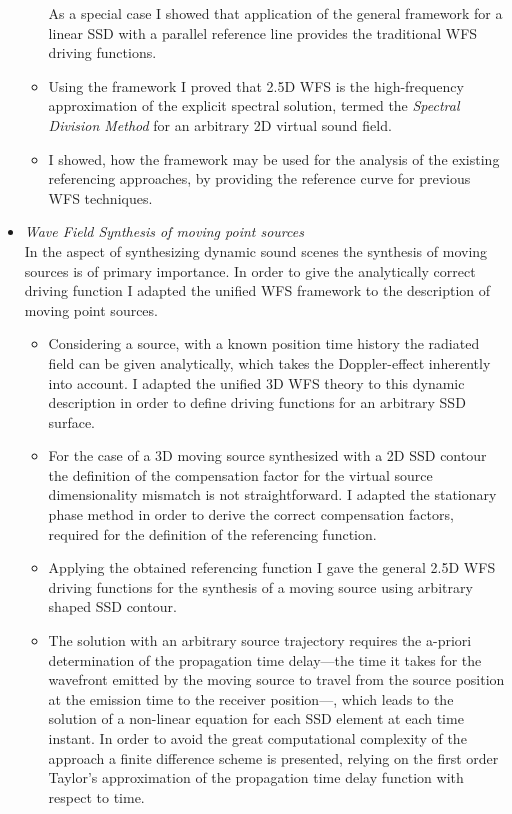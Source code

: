 \documentclass[a4paper,10pt]{article}
\begin{document}
\begin{itemize}
\begin{itemize}
As a special case I showed that application of the general framework for a linear SSD with a parallel reference line provides the traditional WFS driving functions.
\item Using the framework I proved that 2.5D WFS is the high-frequency approximation of the explicit spectral solution, termed the \emph{Spectral Division Method} for an arbitrary 2D virtual sound field.
\item I showed, how the framework may be used for the analysis of the existing referencing approaches, by providing the reference curve for previous WFS techniques.
\end{itemize}
%
\item \emph{Wave Field Synthesis of moving point sources}\\
In the aspect of synthesizing dynamic sound scenes the synthesis of moving sources is of primary importance.
In order to give the analytically correct driving function I adapted the unified WFS framework to the description of moving point sources.
\begin{itemize}
\item Considering a source, with a known position time history the radiated field can be given analytically, which takes the Doppler-effect inherently into account.
I adapted the unified 3D WFS theory to this dynamic description in order to define driving functions for an arbitrary SSD surface.
\item For the case of a 3D moving source synthesized with a 2D SSD contour the definition of the compensation factor for the virtual source dimensionality mismatch is not straightforward.
I adapted the stationary phase method in order to derive the correct compensation factors, required for the definition of the referencing function. 
\item Applying the obtained referencing function I gave the general 2.5D WFS driving functions for the synthesis of a moving source using arbitrary shaped SSD contour.
\item The solution with an arbitrary source trajectory requires the a-priori determination of the propagation time delay---the time it takes for the wavefront emitted by the moving source to travel from the source position at the emission time to the receiver position---, which leads to the solution of a non-linear equation for each SSD element at each time instant.
In order to avoid the great computational complexity of the approach a finite difference scheme is presented, relying on the first order Taylor's approximation of the propagation time delay function with respect to time.

\end{itemize}
\end{itemize}
\end{document}
